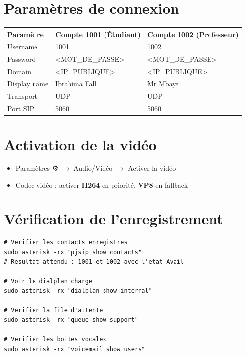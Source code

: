 \documentclass[a4paper,11pt]{report}
\begin{document}
\section{Paramètres de connexion}

\begin{center}
\begin{tabular}{lll}
\toprule
\rowcolor{primarylight}\textbf{Paramètre} & \textbf{Compte 1001 (Étudiant)} & \textbf{Compte 1002 (Professeur)}\\
\midrule
Username & 1001 & 1002\\
Password & <MOT_DE_PASSE> & <MOT_DE_PASSE>\\
Domain & <IP_PUBLIQUE> & <IP_PUBLIQUE>\\
Display name & Ibrahima Fall & Mr Mbaye\\
Transport & UDP & UDP\\
Port SIP & 5060 & 5060\\
\bottomrule
\end{tabular}
\end{center}

\section{Activation de la vidéo}

\begin{itemize}[leftmargin=1.4em, itemsep=3pt]
  \item Paramètres ⚙ $\to$ Audio/Vidéo $\to$ Activer la vidéo
  \item Codec vidéo : activer \textbf{H264} en priorité, \textbf{VP8} en fallback
\end{itemize}

\section{Vérification de l'enregistrement}

\begin{codebox}
\begin{lstlisting}
# Verifier les contacts enregistres
sudo asterisk -rx "pjsip show contacts"
# Resultat attendu : 1001 et 1002 avec l'etat Avail

# Voir le dialplan charge
sudo asterisk -rx "dialplan show internal"

# Verifier la file d'attente
sudo asterisk -rx "queue show support"

# Verifier les boites vocales
sudo asterisk -rx "voicemail show users"
\end{lstlisting}
\end{codebox}
\end{document}
